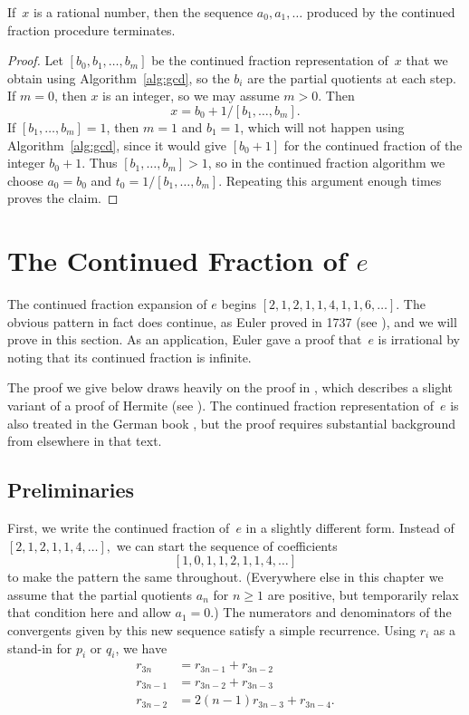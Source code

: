 \begin{proposition}\label{prop:cfterm}
If~$x$ is a rational number, then the sequence
$a_0, a_1, \ldots $
produced by the continued fraction procedure terminates.
\end{proposition}
\begin{proof}
Let $[b_0,b_1,\ldots, b_m]$ be the continued fraction representation
of~$x$ that we obtain using Algorithm~\ref{alg:gcd}, so the $b_i$
are the partial quotients at each step.
If $m=0$, then $x$ is an integer, so we may assume $m>0$.
Then
$$
  x = b_0 + 1/[b_1,\ldots,b_m].
$$
If $[b_1,\ldots,b_m]=1$, then $m=1$ and $b_1=1$,
which will not happen using Algorithm~\ref{alg:gcd}, since
it would give $[b_0+1]$ for the continued fraction of
the integer $b_0+1$.
Thus $[b_1,\ldots,b_m]>1$, so in the continued fraction
algorithm we choose $a_0 = b_0$ and $t_0 = 1/[b_1, \ldots, b_m]$.
Repeating this argument enough times proves the claim.
\end{proof}


\section{The Continued Fraction of $e$}\label{sec:contfrac_e}

The continued fraction expansion of $e$ begins $[2, 1, 2, 1, 1, 4, 1,
1, 6, \ldots]$.  The obvious pattern in fact does continue, as
Euler proved in 1737 (see \cite{euler:contfrac}), and we
will prove in this section.  As an application, Euler gave a proof
that~$e$ is irrational by noting that its continued fraction is
infinite.

The proof we give below draws heavily on the proof in
\cite{cohn:contfrac}, which describes a slight variant of a proof of
Hermite (see \cite{olds:contfrac}).  The continued fraction
representation of~$e$ is also treated in the German book
\cite{perron}, but the proof requires substantial background from
elsewhere in that text.

\subsection{Preliminaries}
First, we write the continued fraction of~$e$ in a slightly different
form. Instead of
$[2,1,2,1,1,4,\ldots],$ we can start the sequence of
coefficients $$
[1,0,1,1,2,1,1,4,\ldots]
$$
to make the pattern the same throughout. (Everywhere else in
this chapter we assume that the partial quotients $a_n$ for $n\geq 1$
are positive, but temporarily relax that
condition here and allow $a_1=0$.) The numerators and
denominators of the convergents given by this new sequence satisfy a
simple recurrence. Using $r_i$ as a stand-in for $p_i$ or $q_i$, we
have
\begin{align*}
r_{3n}&=r_{3n-1}+r_{3n-2}\\
r_{3n-1}&=r_{3n-2}+r_{3n-3}\\
r_{3n-2}&=2(n-1)r_{3n-3}+r_{3n-4}.
\end{align*}

